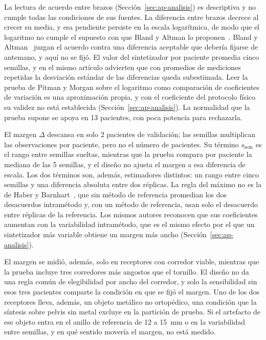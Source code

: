 La lectura de acuerdo entre brazos (Sección~\ref{sec:ap-analisis}) es descriptiva y no cumple todas las condiciones de sus fuentes. La diferencia entre brazos decrece al crecer su media, y esa pendiente persiste en la escala logarítmica, de modo que el logaritmo no cumple el supuesto con que Bland y Altman lo proponen~\cite{bland1986statisticalmeasurement}. Bland y Altman~\cite{bland1986statisticalmeasurement} juzgan el acuerdo contra una diferencia aceptable que debería fijarse de antemano, y aquí no se fijó. El valor del sintetizador por paciente promedia cinco semillas, y en el mismo artículo advierten que con promedios de mediciones repetidas la desviación estándar de las diferencias queda subestimada. Leer la prueba de Pitman y Morgan sobre el logaritmo como comparación de coeficientes de variación es una aproximación propia, y con el coeficiente del protocolo físico su validez no está establecida (Sección~\ref{sec:ap-analisis}). La normalidad que la prueba supone se apoya en 13 pacientes, con poca potencia para rechazarla.

El margen $\Delta$ descansa en solo 2 pacientes de validación; las semillas multiplican las observaciones por paciente, pero no el número de pacientes. Su término $s_{\mathrm{sem}}$ es el rango entre semillas sueltas, mientras que la prueba compara por paciente la mediana de las 5 semillas, y el diseño no ajusta el margen a esa diferencia de escala. Los dos términos son, además, estimadores distintos: un rango entre cinco semillas y una diferencia absoluta entre dos réplicas. La regla del máximo no es la de Haber y Barnhart~\cite{haber2008general}, que sin método de referencia promedian los dos desacuerdos intramétodo y, con un método de referencia, usan solo el desacuerdo entre réplicas de la referencia. Los mismos autores reconocen que sus coeficientes aumentan con la variabilidad intramétodo, que es el mismo efecto por el que un sintetizador más variable obtiene un margen más ancho (Sección~\ref{sec:ap-analisis}).

El margen se midió, además, solo en receptores con corredor viable, mientras que la prueba incluye tres corredores más angostos que el tornillo. El diseño no da una regla común de elegibilidad por ancho del corredor, y solo la sensibilidad sin esos tres pacientes comparte la condición en que se fijó el margen. Uno de los dos receptores lleva, además, un objeto metálico no ortopédico, una condición que la síntesis sobre pelvis sin metal excluye en la partición de prueba. Si el artefacto de ese objeto entra en el anillo de referencia de 12 a 15~mm o en la variabilidad entre semillas, y en qué sentido movería el margen, no está medido.

